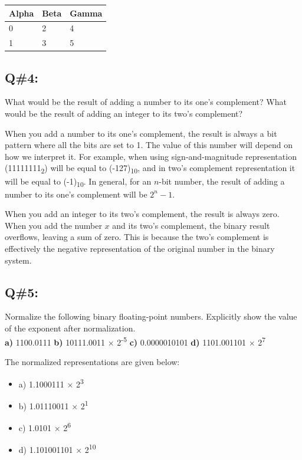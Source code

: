 \begin{table}[htbp]
    \centering
    \begin{tabularx}{\textwidth}{| X | X | X |}
        \hline
        Alpha     & Beta     & Gamma     \\ \hline
        0         & 2        & 4         \\ \hline
        1         & 3        & 5         \\ \hline
    \end{tabularx}
\end{table}




\subsection*{Q\#4:}
What would be the result of adding a number to its one’s complement? What would be the result of adding an integer to its two’s complement?

When you add a number to its one's complement, the result is always a bit pattern where all the bits are set to 1. The value of this number will depend on how we interpret it. For example, when using sign-and-magnitude representation (11111111\textsubscript{2}) will be equal to (-127)\textsubscript{10}, and in two’s complement representation it will be equal to (-1)\textsubscript{10}. In general, for an $n$-bit number, the result of adding a number to its one's complement will be $2^n - 1$.

When you add an integer to its two’s complement, the result is always zero. When you add the number $x$ and its two’s complement, the binary result overflows, leaving a sum of zero. This is because the two’s complement is effectively the negative representation of the original number in the binary system.

\subsection*{Q\#5:}
Normalize the following binary floating-point numbers. Explicitly show the value of the exponent after normalization.\\
\textbf{a)} 1100.0111 \quad \textbf{b)} 10111.0011 × 2\textsuperscript{-5} \quad \textbf{c)} 0.0000010101 \quad \textbf{d)} 1101.001101 × 2\textsuperscript{7}

The normalized representations are given below:
\begin{itemize}
  \item a) 1.1000111 × 2\textsuperscript{3}
  \item b) 1.01110011 × 2\textsuperscript{1}
  \item c) 1.0101 × 2\textsuperscript{6}
  \item d) 1.101001101 × 2\textsuperscript{10}
\end{itemize}

